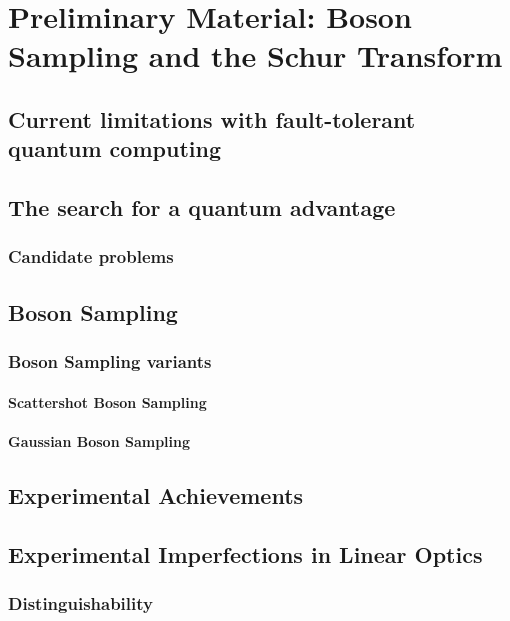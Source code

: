 \chapter{Preliminary Material: Boson Sampling and the Schur Transform}

\section{Current limitations with fault-tolerant quantum computing}

\section{The search for a quantum advantage}

\subsection{Candidate problems}

\section{Boson Sampling}

\subsection{Boson Sampling variants}

\subsubsection{Scattershot Boson Sampling}

\subsubsection{Gaussian Boson Sampling}

\section{Experimental Achievements}

\section{Experimental Imperfections in Linear Optics}

\subsection{Distinguishability}

